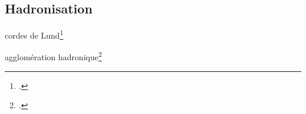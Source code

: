 \subsection{Hadronisation}\label{chapter-JERC-section-jets-subsec-hadronisation}


cordes de Lund\footcite{Andersson_parton_fragmentation}

agglomération hadronique\footcite{Winter_2004}

